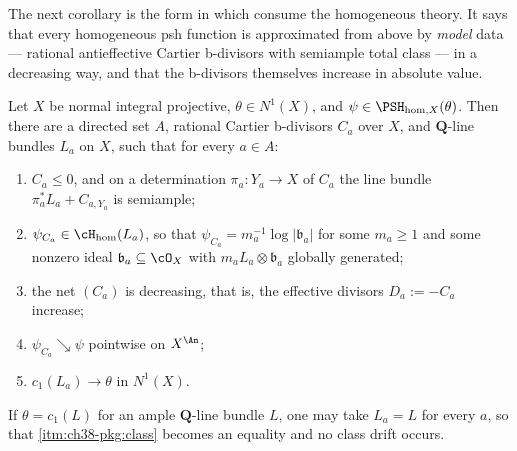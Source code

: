The next corollary is the form in which
 consume
the homogeneous theory.  It says that every homogeneous psh function is
approximated from above by \emph{model} data --- rational antieffective
Cartier b-divisors with semiample total class --- in a decreasing way, and
that the b-divisors themselves increase in absolute value.

\begin{corollary}
\label{cor:ch38-gf-regularization-bdivisor}
Let $X$ be normal integral projective, $\theta\in N^1(X)$, and
$\psi\in\PSH_{\mathrm{hom},X}(\theta)$.  Then there are a directed set
$A$, rational Cartier b-divisors $C_a$ over $X$, and
$\mathbf Q$-line bundles $L_a$ on $X$, such that for every
$a\in A$:
\begin{enumerate}
\item\label{itm:ch38-pkg:neg} $C_a\leq0$, and on a determination
 $\pi_a:Y_a\to X$ of $C_a$ the line bundle
 $\pi_a^*L_a+C_{a,Y_a}$ is semiample;
\item\label{itm:ch38-pkg:fs} $\psi_{C_a}\in\cH_{\mathrm{hom}}(L_a)$, so
 that $\psi_{C_a}=m_a^{-1}\log|\mathfrak b_a|$ for some
 $m_a\geq1$ and some nonzero ideal
 $\mathfrak b_a\subseteq\cO_X$ with
 $m_aL_a\otimes\mathfrak b_a$ globally generated;
\item\label{itm:ch38-pkg:mono} the net $(C_a)$ is decreasing, that is,
 the effective divisors $D_a:=-C_a$ increase;
\item\label{itm:ch38-pkg:limit} $\psi_{C_a}\searrow\psi$ pointwise on
 $X^{\An}$;
\item\label{itm:ch38-pkg:class} $c_1(L_a)\to\theta$ in $N^1(X)$.
\end{enumerate}
If $\theta=c_1(L)$ for an ample $\mathbf Q$-line bundle $L$, one may
take $L_a=L$ for every $a$, so that \cref{itm:ch38-pkg:class} becomes
an equality and no class drift occurs.
\end{corollary}

